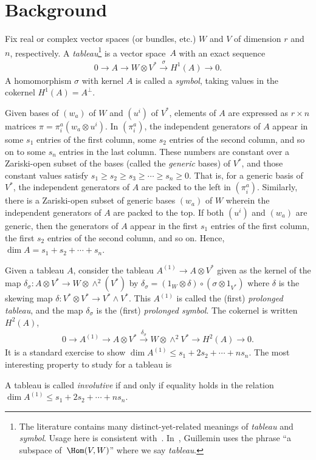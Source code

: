 \section{Background}
Fix real or complex vector spaces (or bundles, etc.) $W$ and $V$ of dimension $r$ and $n$,
respectively. A
\textit{tableau}\footnote{The literature contains many
distinct-yet-related meanings of \emph{tableau} and \emph{symbol}.
Usage here is consistent with~\cite{BCGGG}.  In~\cite{Guillemin1968}, Guillemin
uses the phrase ``a subspace of~$\Hom(V,W)$'' where we say \emph{tableau}.}
is a vector space~$A$ with an exact sequence
\begin{gather*}
0 \longrightarrow A \longrightarrow W \otimes V^* \overset{\sigma}{\longrightarrow} H^{1}(A) \longrightarrow 0.
\label{spencer1}
\end{gather*}
A homomorphism $\sigma$ with kernel $A$ is called a \textit{symbol}, taking
values in the cokernel $H^{1}(A)=A^\perp$.

Given bases of $(w_a)$ of $W$ and $(u^i)$ of $V^*$, elements of $A$ are expressed as $r \times n$
matrices $\pi = \pi^a_i (w_a \otimes u^i)$.
In $(\pi^a_i)$, the independent generators of $A$ appear in some $s_1$ entries of the f\/irst
column, some $s_2$ entries of the second column, and so on to some $s_n$
entries in the last column.
These numbers are constant over a Zariski-open subset of the bases (called the
\textit{generic} bases) of $V^*$, and those constant values satisfy $s_1
\geq s_2 \geq s_3 \geq \cdots \geq s_n \geq 0$.  That is, for a generic basis
of $V^*$, the independent generators of $A$ are packed to the left in $(\pi^a_i)$.
Similarly, there is a Zariski-open subset of generic bases $(w_a)$ of $W$
wherein the independent
generators of $A$ are packed to the top.  If both $(u^i)$ and $(w_a)$ are
generic, then the generators of $A$ appear in the f\/irst $s_1$ entries of the
f\/irst column, the f\/irst $s_2$ entries of the second column, and so on.
Hence, $\dim A = s_1 + s_2 + \cdots + s_n$.

Given a tableau $A$, consider the tableau $A^{(1)} \to  A\otimes V^*$ given as the kernel of
the map $\delta_\sigma\colon A \otimes V^* \to W \otimes \wedge^2 (V^*)$ by
$\delta_\sigma = (1_W \otimes \delta)\circ(\sigma \otimes 1_{V^*})$ where $\delta$ is
the skewing map $\delta\colon V^* \otimes V^* \to V^* \wedge V^*$.
This $A^{(1)}$ is called the (f\/irst) \textit{prolonged tableau}, and the map
$\delta_\sigma$ is the (f\/irst) \textit{prolonged symbol}.  The cokernel is
written $H^{2}(A)$,
\begin{gather*}
0 \longrightarrow A^{(1)} \longrightarrow A \otimes V^* \overset{\delta_\sigma}{\longrightarrow} W \otimes
\wedge^2 V^* \longrightarrow H^2(A) \longrightarrow 0.
\label{spencer2}
\end{gather*}
It is a standard exercise to show
$\dim A^{(1)} \leq s_1 + 2s_2 + \cdots + n s_n$.
The most interesting property to study for a tableau is
\begin{Definition}[involutivity]
A tableau is called \emph{involutive} if and only if equality holds in the relation
$\dim A^{(1)} \leq s_1 + 2s_2 + \cdots + ns_n$.
\end{Definition}


